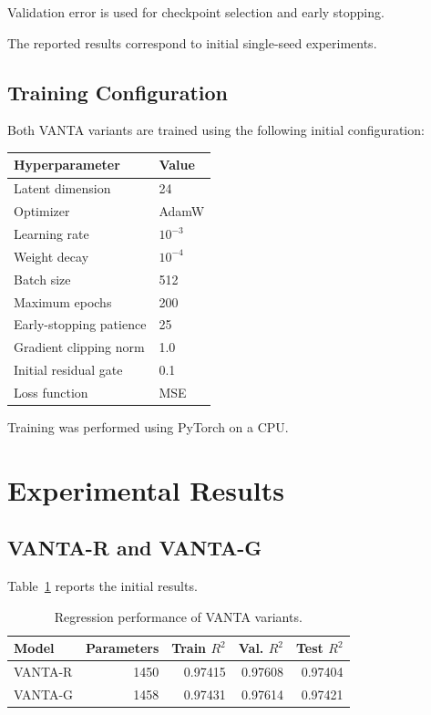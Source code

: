 \documentclass[11pt,a4paper]{article}
\begin{document}
Validation error is used for checkpoint
selection and early stopping.

The reported results correspond to
initial single-seed experiments.

\subsection{Training Configuration}

Both VANTA variants are trained using
the following initial configuration:

\begin{center}
\begin{tabular}{ll}
\toprule
Hyperparameter & Value\\
\midrule
Latent dimension & 24\\
Optimizer & AdamW\\
Learning rate & $10^{-3}$\\
Weight decay & $10^{-4}$\\
Batch size & 512\\
Maximum epochs & 200\\
Early-stopping patience & 25\\
Gradient clipping norm & 1.0\\
Initial residual gate & 0.1\\
Loss function & MSE\\
\bottomrule
\end{tabular}
\end{center}

Training was performed using PyTorch
on a CPU.

\section{Experimental Results}

\subsection{VANTA-R and VANTA-G}

Table~\ref{tab:variants} reports the
initial results.

\begin{table}[ht]
\centering
\caption{Regression performance of VANTA variants.}
\label{tab:variants}
\begin{tabular}{lrrrr}
\toprule
Model & Parameters & Train $R^2$
& Val. $R^2$ & Test $R^2$\\
\midrule
VANTA-R & 1450 & 0.97415 & 0.97608 & 0.97404\\
VANTA-G & 1458 & 0.97431 & 0.97614 & 0.97421\\
\bottomrule
\end{tabular}
\end{table}
\end{document}
